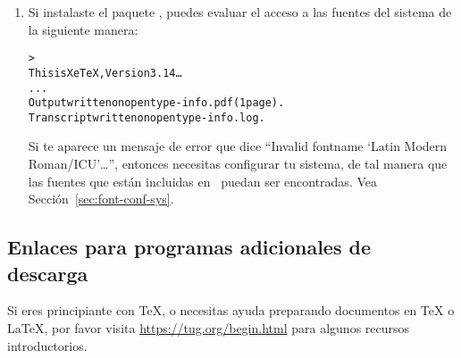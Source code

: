 \documentclass{article}
\begin{document}
\begin{enumerate}
\item Si instalaste el paquete , puedes evaluar el
	acceso a las fuentes del sistema de la siguiente manera:
\begin{alltt}
> 
This is XeTeX, Version 3.14\ldots
...
Output written on opentype-info.pdf (1 page).
Transcript written on opentype-info.log.
\end{alltt}

Si te aparece un mensaje de error que dice ``Invalid fontname `Latin
Modern Roman/ICU'\ldots'', entonces necesitas configurar tu sistema,
de tal manera que las fuentes que están incluidas en \TL\ puedan ser
encontradas. Vea 
Sección~\ref{sec:font-conf-sys}.

\end{enumerate}

\subsection{Enlaces para programas adicionales de descarga}

Si eres principiante con \TeX{}, o necesitas ayuda preparando
documentos en \TeX{} o \LaTeX{}, por favor visita
\url{https://tug.org/begin.html} para algunos recursos introductorios.
\end{document}
